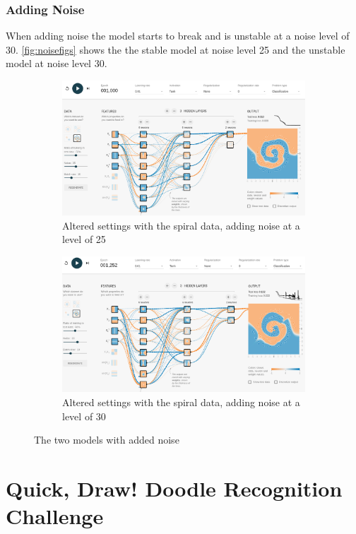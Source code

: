 \documentclass{article}
\begin{document}
\subsubsection{Adding Noise}
When adding noise the model starts to break and is unstable at a noise level of 30. \autoref{fig:noisefigs} shows the the stable model at noise level 25 and the unstable model at noise level 30.

\begin{figure}[h]
  \centering
  \begin{subfigure}[b]{0.48\textwidth}
    \includegraphics[width=\textwidth]{altered_noise_25}
    \caption{Altered settings with the spiral data, adding noise at a level of 25}
    \label{fig:alt_noise_25}
  \end{subfigure}
  \hfill
  \begin{subfigure}[b]{0.48\textwidth}
    \includegraphics[width=\textwidth]{altered_noise_30}
    \caption{Altered settings with the spiral data, adding noise at a level of 30}
    \label{fig:alt_noise_30}
  \end{subfigure}
  \caption{The two models with added noise}
  \label{fig:noisefigs}
\end{figure}

\section{Quick, Draw! Doodle Recognition Challenge}

\end{document}
